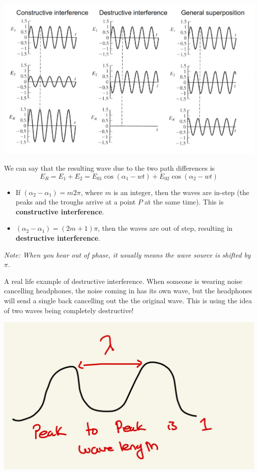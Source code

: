\documentclass[10pt]{article}
\begin{document}
\begin{center}
    \includegraphics*[scale = .5]{imgs/superposition.png}
\end{center}
We can say that the resulting wave due to the two path differences is
\[E_R = E_1 + E_2 = E_{01}\cos(\alpha_1 - wt) + E_{02}\cos(\alpha_2 - wt)\]
\begin{itemize}
    \item If $(\alpha_2 - \alpha_1) = m2\pi$, where $m$ is an integer, then the waves are in-step (the peaks and the troughs arrive at a point $P$ at the same time). This is \textbf{constructive interference}.
    \item $(\alpha_2 - \alpha_1) = (2m+1)\pi$, then the waves are out of step, resulting in \textbf{destructive interference}.
\end{itemize}

\textit{Note: When you hear out of phase, it usually means the wave source is shifted by $\pi$.}

\newblock

A real life example of destructive interference. When someone is wearing noise cancelling headphones, the noise coming in has its own wave, but the headphones will send a single back cancelling out the the original wave. This is using the idea of two waves being completely destructive!
\begin{center}
    \includegraphics*[scale = .25]{imgs/wavelength-fact.jpeg}
\end{center}
\end{document}
